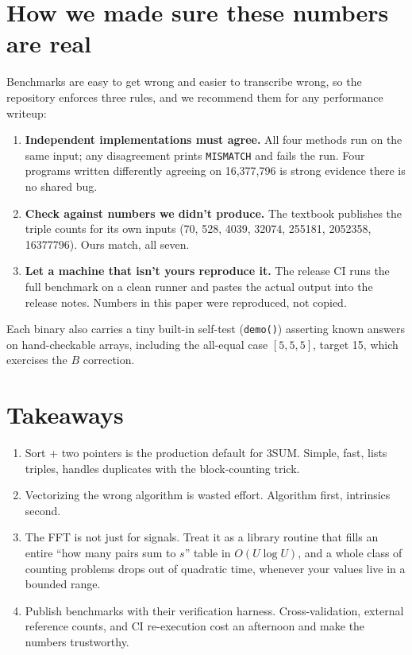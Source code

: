 \documentclass[11pt]{article}
\begin{document}
\section{How we made sure these numbers are real}

Benchmarks are easy to get wrong and easier to transcribe wrong, so the
repository enforces three rules, and we recommend them for any performance
writeup:

\begin{enumerate}
\item \textbf{Independent implementations must agree.} All four methods run on
      the same input; any disagreement prints \texttt{MISMATCH} and fails the
      run. Four programs written differently agreeing on 16{,}377{,}796 is strong
      evidence there is no shared bug.
\item \textbf{Check against numbers we didn't produce.} The textbook publishes
      the triple counts for its own inputs (70, 528, 4039, 32074, 255181,
      2052358, 16377796). Ours match, all seven.
\item \textbf{Let a machine that isn't yours reproduce it.} The release CI runs
      the full benchmark on a clean runner and pastes the actual output into the
      release notes. Numbers in this paper were reproduced, not copied.
\end{enumerate}

Each binary also carries a tiny built-in self-test (\texttt{demo()}) asserting
known answers on hand-checkable arrays, including the all-equal case
$[5,5,5]$, target 15, which exercises the $B$ correction.

\section{Takeaways}

\begin{enumerate}
\item Sort + two pointers is the production default for 3SUM. Simple, fast,
      lists triples, handles duplicates with the block-counting trick.
\item Vectorizing the wrong algorithm is wasted effort. Algorithm first,
      intrinsics second.
\item The FFT is not just for signals. Treat it as a library routine that fills
      an entire ``how many pairs sum to $s$'' table in $O(U\log U)$, and a whole
      class of counting problems drops out of quadratic time, whenever your
      values live in a bounded range.
\item Publish benchmarks with their verification harness. Cross-validation,
      external reference counts, and CI re-execution cost an afternoon and make
      the numbers trustworthy.
\end{enumerate}
\end{document}
